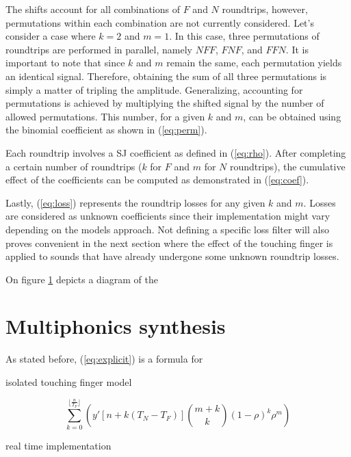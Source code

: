 \documentclass{sigchi}
\begin{document}
The shifts account for all combinations of $F$ and $N$ roundtrips, however, permutations within each combination are not currently considered.
Let's consider a case where $k = 2$ and $m = 1$.
In this case, three permutations of roundtrips are performed in parallel, namely $NFF$, $FNF$, and $FFN$.
It is important to note that since $k$ and $m$ remain the same, each permutation yields an identical signal.
Therefore, obtaining the sum of all three permutations is simply a matter of tripling the amplitude.
Generalizing, accounting for permutations is achieved by multiplying the shifted signal by the number of allowed permutations.
This number, for a given $k$ and $m$, can be obtained using the binomial coefficient as shown in (\ref{eq:perm}).

Each roundtrip involves a SJ coefficient as defined in (\ref{eq:rho}).
After completing a certain number of roundtrips ($k$ for $F$ and $m$ for $N$ roundtrips), the cumulative effect of the coefficients can be computed as demonstrated in (\ref{eq:coef}).

Lastly, (\ref{eq:loss}) represents the roundtrip losses for any given $k$ and $m$.
Losses are considered as unknown coefficients since their implementation might vary depending on the models approach.
Not defining a specific loss filter will also proves convenient in the next section where the effect of the touching finger is applied to sounds that have already undergone some unknown roundtrip losses.

\begin{figure}[h]
	\centering
	\scalebox{1}{}
	\caption{}
	\label{fig:triangle}
\end{figure}

On figure \ref{fig:triangle} depicts a diagram of the

\section{Multiphonics synthesis}
As stated before, (\ref{eq:explicit}) is a formula for

isolated touching finger model

\begin{equation}
	\sum_{k=0}^{\lfloor \frac{n}{T_F} \rfloor}\left(y'[n + k(T_N-T_F)]\binom{m+k}{k} (1 - \rho)^{k} \rho^m\right)
\end{equation}

% 

real time implementation
\end{document}
